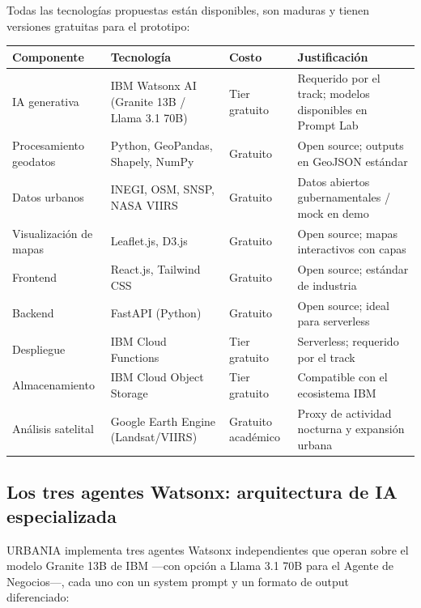 \documentclass[12pt,a4paper]{article}
\begin{document}
Todas las tecnologías propuestas están disponibles, son maduras y tienen versiones gratuitas para el prototipo:

\begin{table}[H]
\centering
\small
\renewcommand{\arraystretch}{1.3}
\begin{tabularx}{\textwidth}{X X X X}
\toprule
\rowcolor{grisoscuro}
\color{white}\textbf{Componente} & \color{white}\textbf{Tecnología} & \color{white}\textbf{Costo} & \color{white}\textbf{Justificación} \\
\midrule
IA generativa & IBM Watsonx AI (Granite 13B / Llama 3.1 70B) & Tier gratuito & Requerido por el track; modelos disponibles en Prompt Lab \\
\rowcolor{fondofila}
Procesamiento geodatos & Python, GeoPandas, Shapely, NumPy & Gratuito & Open source; outputs en GeoJSON estándar \\
Datos urbanos & INEGI, OSM, SNSP, NASA VIIRS & Gratuito & Datos abiertos gubernamentales / mock en demo \\
\rowcolor{fondofila}
Visualización de mapas & Leaflet.js, D3.js & Gratuito & Open source; mapas interactivos con capas \\
Frontend & React.js, Tailwind CSS & Gratuito & Open source; estándar de industria \\
\rowcolor{fondofila}
Backend & FastAPI (Python) & Gratuito & Open source; ideal para serverless \\
Despliegue & IBM Cloud Functions & Tier gratuito & Serverless; requerido por el track \\
\rowcolor{fondofila}
Almacenamiento & IBM Cloud Object Storage & Tier gratuito & Compatible con el ecosistema IBM \\
Análisis satelital & Google Earth Engine (Landsat/VIIRS) & Gratuito académico & Proxy de actividad nocturna y expansión urbana \\
\bottomrule
\end{tabularx}
\end{table}

\subsection{Los tres agentes Watsonx: arquitectura de IA especializada}

URBANIA implementa tres agentes Watsonx independientes que operan sobre el modelo Granite 13B de IBM —con opción a Llama 3.1 70B para el Agente de Negocios—, cada uno con un system prompt y un formato de output diferenciado:
\end{document}
